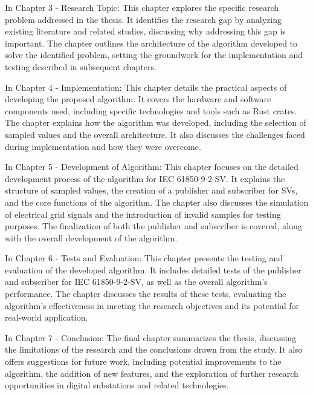 In Chapter 3 - Research Topic: This chapter explores the specific research problem addressed in the thesis. It identifies the research gap by analyzing existing literature and related studies, discussing why addressing this gap is important. The chapter outlines the architecture of the algorithm developed to solve the identified problem, setting the groundwork for the implementation and testing described in subsequent chapters.

In Chapter 4 - Implementation: This chapter details the practical aspects of developing the proposed algorithm. It covers the hardware and software components used, including specific technologies and tools such as Rust crates. The chapter explains how the algorithm was developed, including the selection of sampled values  and the overall architecture. It also discusses the challenges faced during implementation and how they were overcome.

In Chapter 5 - Development of Algorithm: This chapter focuses on the detailed development process of the algorithm for IEC 61850-9-2-SV. It explains the structure of sampled values, the creation of a publisher and subscriber for SVs, and the core functions of the algorithm. The chapter also discusses the simulation of electrical grid signals and the introduction of invalid samples for testing purposes. The finalization of both the publisher and subscriber is covered, along with the overall development of the algorithm.

In Chapter 6 - Tests and Evaluation: This chapter presents the testing and evaluation of the developed algorithm. It includes detailed tests of the publisher and subscriber for IEC 61850-9-2-SV, as well as the overall algorithm's performance. The chapter discusses the results of these tests, evaluating the algorithm's effectiveness in meeting the research objectives and its potential for real-world application.

In Chapter 7 - Conclusion: The final chapter summarizes the thesis, discussing the limitations of the research and the conclusions drawn from the study. It also offers suggestions for future work, including potential improvements to the algorithm, the addition of new features, and the exploration of further research opportunities in digital substations and related technologies.
